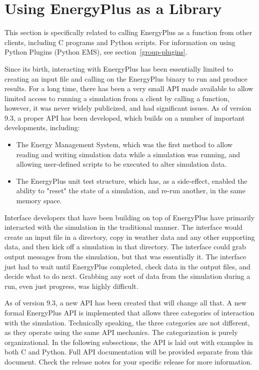 
\section{Using EnergyPlus as a Library}\label{sec:api-usage}

This section is specifically related to calling EnergyPlus as a function from other clients, including C programs and Python scripts.
For information on using Python Plugins (Python EMS), see section~\ref{group-plugins}.

Since its birth, interacting with EnergyPlus has been essentially limited to creating an input file and calling on the EnergyPlus binary to run and produce results.
For a long time, there has been a very small API made available to allow limited access to running a simulation from a client by calling a function, however, it was never widely publicized, and had significant issues.
As of version 9.3, a proper API has been developed, which builds on a number of important developments, including:

\begin{itemize}
 \item The Energy Management System, which was the first method to allow reading and writing simulation data while a simulation was running, and allowing user-defined scripts to be executed to alter simulation data.
 \item The EnergyPlus unit test structure, which has, as a side-effect, enabled the ability to "reset" the state of a simulation, and re-run another, in the same memory space.
\end{itemize}

Interface developers that have been building on top of EnergyPlus have primarily interacted with the simulation in the traditional manner.
The interface would create an input file in a directory, copy in weather data and any other supporting data, and then kick off a simulation in that directory.
The interface could grab output messages from the simulation, but that was essentially it.
The interface just had to wait until EnergyPlus completed, check data in the output files, and decide what to do next.
Grabbing any sort of data from the simulation during a run, even just progress, was highly difficult.

As of version 9.3, a new API has been created that will change all that.
A new formal EnergyPlus API is implemented that allows three categories of interaction with the simulation.
Technically speaking, the three categories are not different, as they operate using the same API mechanics.
The categorization is purely organizational.
In the following subsections, the API is laid out with examples in both C and Python.
Full API documentation will be provided separate from this document.
Check the release notes for your specific release for more information.

